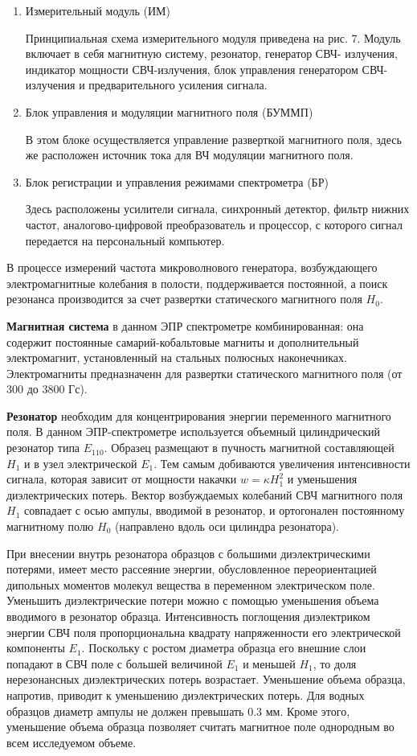 \documentclass[a4paper,14pt]{article}
\begin{document}
\begin{enumerate}
	\item Измерительный модуль (ИМ)
	\par Принципиальная схема измерительного модуля приведена на рис. 7. Модуль включает в себя магнитную систему, резонатор, генератор СВЧ- излучения, индикатор мощности СВЧ-излучения, блок управления генератором СВЧ-излучения и предварительного усиления сигнала.
	\item Блок управления и модуляции магнитного поля (БУММП)
	\par В этом блоке осуществляется управление разверткой магнитного поля, здесь же расположен источник тока для ВЧ модуляции магнитного поля.
	\item Блок регистрации и управления режимами спектрометра (БР)
	\par Здесь расположены усилители сигнала, синхронный детектор, фильтр нижних частот, аналогово-цифровой преобразователь и процессор, с которого сигнал передается на персональный компьютер.
	
\end{enumerate}
В процессе измерений частота микроволнового генератора, возбуждающего электромагнитные колебания в полости, поддерживается постоянной, а поиск резонанса производится за счет развертки статического магнитного поля $ H_0 $.
\par 
\textbf{Магнитная система} в данном ЭПР спектрометре комбинированная: она содержит постоянные самарий-кобальтовые магниты и дополнительный электромагнит, установленный на стальных полюсных наконечниках. Электромагниты предназначенн для развертки статического магнитного поля (от 300 до 3800 Гс).
\par 
\textbf{Резонатор} необходим для концентрирования энергии переменного магнитного поля. В данном ЭПР-спектрометре используется объемный цилиндрический резонатор типа $ E_{110} $. Образец размещают в пучность магнитной составляющей $ H_1 $ и в узел электрической $ E_1 $. Тем самым добиваются увеличения интенсивности сигнала, которая зависит от мощности накачки $ w=\kappa H_1^2 $ и уменьшения диэлектрических потерь. Вектор возбуждаемых колебаний СВЧ магнитного поля $ H_1 $ совпадает с осью ампулы, вводимой в резонатор, и ортогонален постоянному магнитному полю $ H_0 $ (направлено вдоль оси цилиндра резонатора).
\par 
При внесении внутрь резонатора образцов с большими диэлектрическими потерями, имеет место рассеяние энергии, обусловленное переориентацией дипольных моментов молекул вещества в переменном электрическом поле. Уменьшить диэлектрические потери можно с помощью уменьшения объема вводимого в резонатор образца. Интенсивность поглощения диэлектриком энергии СВЧ поля пропорциональна квадрату напряженности его электрической компоненты $ E_1 $. Поскольку с ростом диаметра образца его внешние слои попадают в СВЧ поле с большей величиной $ E_1 $ и меньшей $ H_1 $, то доля нерезонансных диэлектрических потерь возрастает. Уменьшение объема образца, напротив, приводит к уменьшению диэлектрических потерь. Для водных образцов диаметр ампулы не должен превышать 0.3 мм. Кроме этого, уменьшение объема образца позволяет считать магнитное поле однородным во всем исследуемом объеме.
\end{document}
